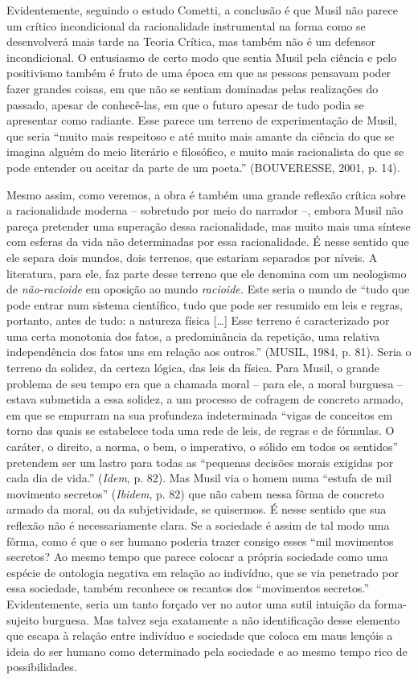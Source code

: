 Evidentemente, seguindo o estudo Cometti, a conclusão é que Musil não
parece um crítico incondicional da racionalidade instrumental na forma
como se desenvolverá mais tarde na Teoria Crítica, mas também não é um
defensor incondicional. O entusiasmo de certo modo que sentia Musil pela
ciência e pelo positivismo também é fruto de uma época em que as pessoas
pensavam poder fazer grandes coisas, em que não se sentiam dominadas
pelas realizações do passado, apesar de conhecê-las, em que o futuro
apesar de tudo podia se apresentar como radiante. Esse parece um terreno
de experimentação de Musil, que seria ``muito mais respeitoso e até
muito mais amante da ciência do que se imagina alguém do meio literário
e filosófico, e muito mais racionalista do que se pode entender ou
aceitar da parte de um poeta.'' (BOUVERESSE, 2001, p. 14).

Mesmo assim, como veremos, a obra é também uma grande reflexão crítica
sobre a racionalidade moderna -- sobretudo por meio do narrador --,
embora Musil não pareça pretender uma superação dessa racionalidade, mas
muito mais uma síntese com esferas da vida não determinadas por essa
racionalidade. É nesse sentido que ele separa dois mundos, dois
terrenos, que estariam separados por níveis. A literatura, para ele, faz
parte desse terreno que ele denomina com um neologismo de
\emph{não-racioide} em oposição ao mundo \emph{racioide.} Este seria o
mundo de ``tudo que pode entrar num sistema científico, tudo que pode
ser resumido em leis e regras, portanto, antes de tudo: a natureza
física {[}\ldots{}{]} Esse terreno é caracterizado por uma certa
monotonia dos fatos, a predominância da repetição, uma relativa
independência dos fatos uns em relação aos outros.'' (MUSIL, 1984, p.
81). Seria o terreno da solidez, da certeza lógica, das leis da física.
Para Musil, o grande problema de seu tempo era que a chamada moral --
para ele, a moral burguesa -- estava submetida a essa solidez, a um
processo de cofragem de concreto armado, em que se empurram na sua
profundeza indeterminada ``vigas de conceitos em torno das quais se
estabelece toda uma rede de leis, de regras e de fórmulas. O caráter, o
direito, a norma, o bem, o imperativo, o sólido em todos os sentidos''
pretendem ser um lastro para todas as ``pequenas decisões morais
exigidas por cada dia de vida.'' (\emph{Idem}, p. 82). Mas Musil via o
homem numa ``estufa de mil movimento secretos'' (\emph{Ibidem}, p. 82)
que não cabem nessa fôrma de concreto armado da moral, ou da
subjetividade, se quisermos. É nesse sentido que sua reflexão não é
necessariamente clara. Se a sociedade é assim de tal modo uma fôrma,
como é que o ser humano poderia trazer consigo esses ``mil movimentos
secretos? Ao mesmo tempo que parece colocar a própria sociedade como uma
espécie de ontologia negativa em relação ao indivíduo, que se via
penetrado por essa sociedade, também reconhece os recantos dos
``movimentos secretos.'' Evidentemente, seria um tanto forçado ver no
autor uma sutil intuição da forma-sujeito burguesa. Mas talvez seja
exatamente a não identificação desse elemento que escapa à relação entre
indivíduo e sociedade que coloca em maus lençóis a ideia do ser humano
como determinado pela sociedade e ao mesmo tempo rico de possibilidades.


